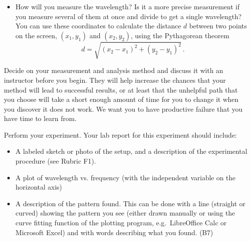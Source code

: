 \begin{steps}
\begin{itemize}
		\item How will you measure the wavelength? Is it a more precise measurement if you measure several of them at once and divide to get a single wavelength? You can use these coordinates to calculate the distance $d$ between two points on the screen, $(x_1, y_1)$ and $(x_2, y_2)$, using the Pythagorean theorem
		\begin{equation}
		d = \sqrt{(x_2-x_1)^2+(y_2-y_1)^2} \,.
		\end{equation}
			
		
	\end{itemize}

	\item Decide on your measurement and analysis method and discuss it with an instructor before you begin. They will help increase the chances that your method will lead to successful results, or at least that the unhelpful path that you choose will take a short enough amount of time for you to change it when you discover it does not work. We want you to have productive failure that you have time to learn from.
	
	\item Perform your experiment. Your lab report for this experiment should include:
	\begin{itemize}
		\item A labeled sketch or photo of the setup, and a description of the experimental procedure (see Rubric F1).
		
		\item A plot of wavelength vs. frequency (with the independent variable on the horizontal axis)
		
		\item A description of the pattern found. This can be done with a line (straight or curved) showing the pattern you see (either drawn manually or using the curve fitting function of the plotting program, e.g.\ LibreOffice Calc or Microsoft Excel) and with words describing what you found. (B7)
		

\end{itemize}
\end{steps}
